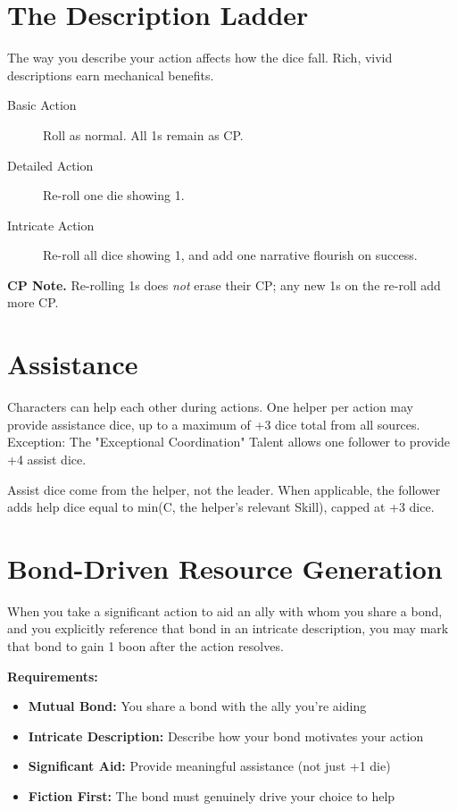 \section{The Description Ladder}

The way you describe your action affects how the dice fall. Rich, vivid descriptions earn mechanical benefits.

\begin{description}
  \item[Basic Action]  Roll as normal. All 1s remain as CP.
  \item[Detailed Action]  Re-roll one die showing 1.
  \item[Intricate Action]  Re-roll all dice showing 1, and add one narrative flourish on success.
\end{description}

\noindent\textbf{CP Note.} Re-rolling 1s does \emph{not} erase their CP; any new 1s on the re-roll add more CP.

\section{Assistance}

Characters can help each other during actions. One helper per action may provide assistance dice, up to a maximum of +3 dice total from all sources. Exception: The "Exceptional Coordination" Talent  allows one follower to provide +4 assist dice.

Assist dice come from the helper, not the leader. When applicable, the follower adds help dice equal to min(C, the helper's relevant Skill), capped at +3 dice.

\section{Bond-Driven Resource Generation}

When you take a significant action to aid an ally with whom you share a bond, and you explicitly reference that bond in an intricate description, you may mark that bond to gain 1 boon after the action resolves.

\textbf{Requirements:}
\begin{itemize}
    \item \textbf{Mutual Bond:} You share a bond with the ally you're aiding
    \item \textbf{Intricate Description:} Describe how your bond motivates your action
    \item \textbf{Significant Aid:} Provide meaningful assistance (not just +1 die)
    \item \textbf{Fiction First:} The bond must genuinely drive your choice to help
\end{itemize}

